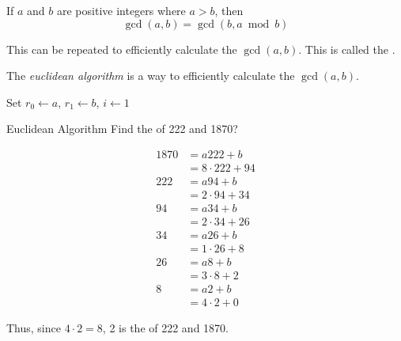 \begin{lemma}\label{lemma:Compute_GCD}
  If $a$ and $b$ are positive integers where $a > b$, then
  \begin{equation}\label{eq:Compute_GCD}
    \gcd(a, b) = \gcd(b, a \bmod b)
  \end{equation}
  \begin{remark*}
    This can be repeated to efficiently calculate the $\gcd(a, b)$.
    This is called the .
  \end{remark*}
\end{lemma}

\begin{definition}\label{def:Euclidean_Algorithm}
  The \emph{euclidean algorithm} is a way to efficiently calculate the $\gcd(a, b)$.
  
  \begin{algorithm}[H]
    \DontPrintSemicolon{}

    \BlankLine{}
    Set $r_{0} \leftarrow a$, $r_{1} \leftarrow b$, $i \leftarrow 1$ \;
    \caption{Euclidean Algorithm}
    \label{algo:Euclidean_Algorithm}
  \end{algorithm}
\end{definition}

\begin{example}{Euclidean Algorithm}
  Find the  of 222 and 1870?

  \tcblower{}

  \begin{align*}
    1870 &= a 222 + b \\
         &= 8 \cdot 222 + 94 \\
    222 &= a 94 + b \\
         &= 2 \cdot 94 + 34 \\
    94 &= a 34 + b \\
         &= 2 \cdot 34 + 26 \\
    34 &= a 26 + b \\
         &= 1 \cdot 26 + 8 \\
    26 &= a 8 + b \\
         &= 3 \cdot 8 + 2 \\
    8 &= a 2 + b \\
         &= 4 \cdot 2 + 0
  \end{align*}

  Thus, since $4 \cdot 2 = 8$, 2 is the  of 222 and 1870.
\end{example}

